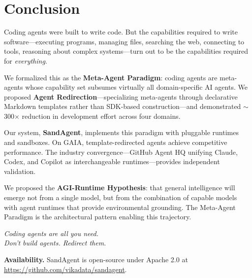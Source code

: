 \section{Conclusion}

Coding agents were built to write code. But the capabilities required to write software---executing programs, managing files, searching the web, connecting to tools, reasoning about complex systems---turn out to be the capabilities required for \textit{everything}.

We formalized this as the \textbf{Meta-Agent Paradigm}: coding agents are meta-agents whose capability set subsumes virtually all domain-specific AI agents. We proposed \textbf{Agent Redirection}---specializing meta-agents through declarative Markdown templates rather than SDK-based construction---and demonstrated $\sim$300$\times$ reduction in development effort across four domains.

Our system, \textbf{SandAgent}, implements this paradigm with pluggable runtimes and sandboxes. On GAIA, template-redirected agents achieve competitive performance. The industry convergence---GitHub Agent HQ unifying Claude, Codex, and Copilot as interchangeable runtimes---provides independent validation.

We proposed the \textbf{AGI-Runtime Hypothesis}: that general intelligence will emerge not from a single model, but from the combination of capable models with agent runtimes that provide environmental grounding. The Meta-Agent Paradigm is the architectural pattern enabling this trajectory.

\begin{center}
\large
\textit{Coding agents are all you need.\\Don't build agents. Redirect them.}
\end{center}

\textbf{Availability.} SandAgent is open-source under Apache 2.0 at \url{https://github.com/vikadata/sandagent}.
